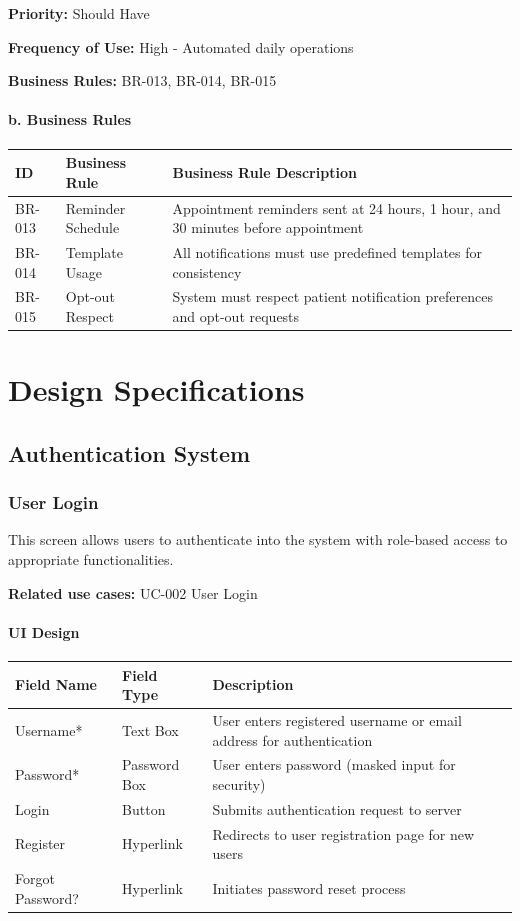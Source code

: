 \documentclass[12pt,a4paper]{article}
\begin{document}
\textbf{Priority:} Should Have

\textbf{Frequency of Use:} High - Automated daily operations

\textbf{Business Rules:} BR-013, BR-014, BR-015

\paragraph{b. Business Rules}

\begin{longtable}{|p{2cm}|p{4cm}|p{8cm}|}
\hline
\textbf{ID} & \textbf{Business Rule} & \textbf{Business Rule Description} \\
\hline
BR-013 & Reminder Schedule & Appointment reminders sent at 24 hours, 1 hour, and 30 minutes before appointment \\
\hline
BR-014 & Template Usage & All notifications must use predefined templates for consistency \\
\hline
BR-015 & Opt-out Respect & System must respect patient notification preferences and opt-out requests \\
\hline
\end{longtable}

\section{Design Specifications}

\subsection{Authentication System}

\subsubsection{User Login}

This screen allows users to authenticate into the system with role-based access to appropriate functionalities.

\textbf{Related use cases:} UC-002 User Login

\paragraph{UI Design}

\begin{longtable}{|p{3cm}|p{3cm}|p{8cm}|}
\hline
\textbf{Field Name} & \textbf{Field Type} & \textbf{Description} \\
\hline
Username* & Text Box & User enters registered username or email address for authentication \\
\hline
Password* & Password Box & User enters password (masked input for security) \\
\hline
Login & Button & Submits authentication request to server \\
\hline
Register & Hyperlink & Redirects to user registration page for new users \\
\hline
Forgot Password? & Hyperlink & Initiates password reset process \\
\hline
\end{longtable}
\end{document}
